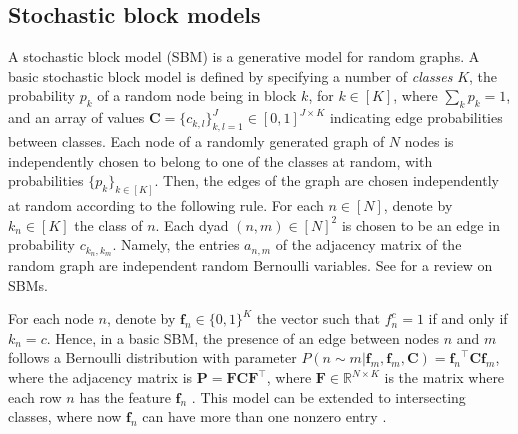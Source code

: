 \documentclass{article}
\theoremstyle{plain}
\theoremstyle{definition}
\theoremstyle{remark}
\newcommand{\ron}[1]{{{\textcolor{red}{\textbf{[Ron:} {#1}\textbf{]}}}}}
\begin{document}


\subsection{Stochastic block models} 
\label{Stochastic block models} 

A stochastic block model (SBM) is a generative model for random graphs. 
A basic stochastic block model is defined by specifying a number of \emph{classes} $K$, the probability $p_k$ of a random node being in block $k$, for $k\in[K]$, where $\sum_kp_k=1$, and an array of values $\mathbf{C}=\{c_{k,l}\}_{k,l=1}^J\in [0,1]^{J\times K}$ indicating edge probabilities between classes. Each node  of a randomly generated graph of $N$ nodes is independently chosen to belong to one of the classes at random, with probabilities  $\{p_k\}_{k\in[K]}$.  Then, the edges of the graph are chosen independently at random according to the following rule. For each $n\in[N]$, denote by $k_n\in[K]$ the class of $n$. Each dyad $(n,m)\in[N]^2$ is chosen to be an edge in probability $c_{k_n,k_m}$. Namely, the entries $a_{n,m}$ of the adjacency matrix of the random graph are independent random Bernoulli variables. See \cite{lee2019review} for a review on SBMs.

For each node $n$, denote by $\mathbf{f}_n\in\{0,1\}^K$ the vector such that $f_n^c=1$ if and only if $k_n=c$. Hence, in a basic SBM, the presence of an edge between nodes $n$ and $m$ follows a Bernoulli distribution with parameter $P(n\sim m|\mathbf{f}_m,\mathbf{f}_m,\mathbf{C}) = {\mathbf{f}_n}^\top  \mathbf{C} \mathbf{f}_m$, where the adjacency matrix is $\mathbf{P} = \mathbf{F}  \mathbf{C} \mathbf{F}^\top$, where $\mathbf{F}\in\mathbb{R}^{N\times K}$ is the matrix where each row $n$ has the feature $\mathbf{f}_n$ \cite{nowicki2001estimation}. 
This model can be extended to intersecting classes, where now $\mathbf{f}_n$ can have more than one nonzero entry \cite{morup2011infinite,miller2009overlappingsbm1,palla2012overlappingsbm2}.
\end{document}
